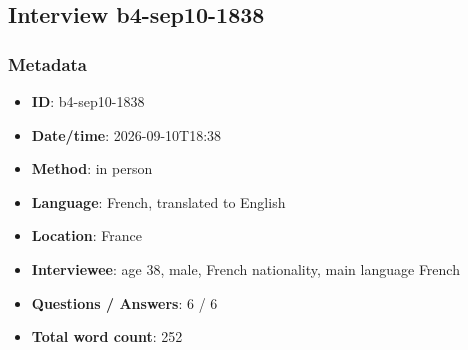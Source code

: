 \subsection{Interview b4-sep10-1838}\label{int:b4-sep10-1838}
\subsubsection*{Metadata}
\begin{itemize}
  \item \textbf{ID}: b4-sep10-1838
  \item \textbf{Date/time}: 2026-09-10T18:38
  \item \textbf{Method}: in person
  \item \textbf{Language}: French, translated to English
  \item \textbf{Location}: France
  \item \textbf{Interviewee}: age 38, male, French nationality, main language French
  \item \textbf{Questions / Answers}: 6 / 6
  \item \textbf{Total word count}: 252
\end{itemize}
